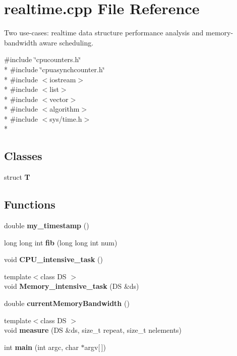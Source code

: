 \section{realtime.\+cpp File Reference}
\label{realtime_8cpp}


Two use-\/cases\+: realtime data structure performance analysis and memory-\/bandwidth aware scheduling.  


{\ttfamily \#include \char`\"{}cpucounters.\+h\char`\"{}}\\*
{\ttfamily \#include \char`\"{}cpuasynchcounter.\+h\char`\"{}}\\*
{\ttfamily \#include $<$iostream$>$}\\*
{\ttfamily \#include $<$list$>$}\\*
{\ttfamily \#include $<$vector$>$}\\*
{\ttfamily \#include $<$algorithm$>$}\\*
{\ttfamily \#include $<$sys/time.\+h$>$}\\*
\subsection*{Classes}
\begin{DoxyCompactItemize}
\item 
struct {\bf T}
\end{DoxyCompactItemize}
\subsection*{Functions}
\begin{DoxyCompactItemize}
\item 
double {\bfseries my\+\_\+timestamp} ()\label{realtime_8cpp_ab6b2adca133c5e31dca366cdc686edbe}

\item 
long long int {\bfseries fib} (long long int num)\label{realtime_8cpp_a26067fd04774b9351f8ad25314b01077}

\item 
void {\bfseries C\+P\+U\+\_\+intensive\+\_\+task} ()\label{realtime_8cpp_ae78e322a91d8697aeb883161ad21e77b}

\item 
{\footnotesize template$<$class DS $>$ }\\void {\bfseries Memory\+\_\+intensive\+\_\+task} (DS \&ds)\label{realtime_8cpp_a722f2b5a21f9cb12dae7790963a0cdba}

\item 
double {\bfseries current\+Memory\+Bandwidth} ()\label{realtime_8cpp_a48c3e8e5a58ab1456c875c332a2df4b9}

\item 
{\footnotesize template$<$class DS $>$ }\\void {\bfseries measure} (DS \&ds, size\+\_\+t repeat, size\+\_\+t nelements)\label{realtime_8cpp_a6e4dd9241429371cfcb1d2b3127ea7a8}

\item 
int {\bfseries main} (int argc, char $\ast$argv[$\,$])\label{realtime_8cpp_a0ddf1224851353fc92bfbff6f499fa97}

\end{DoxyCompactItemize}
